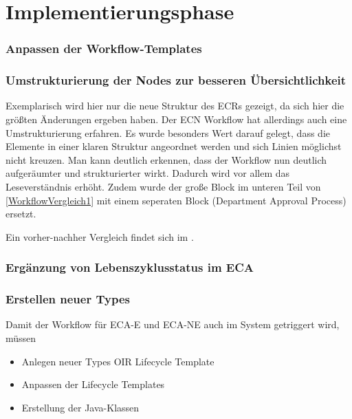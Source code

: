 \section{Implementierungsphase}  %
\label{sec:Implementierungsphase}

\subsubsection{Anpassen der Workflow-Templates}
\subsubsection*{Umstrukturierung der Nodes zur besseren Übersichtlichkeit}
Exemplarisch wird hier nur die neue Struktur des ECRs gezeigt, da sich hier die größten Änderungen ergeben haben.
Der ECN Workflow hat allerdings auch eine Umstrukturierung erfahren.
Es wurde besonders Wert darauf gelegt, dass die Elemente in einer klaren Struktur angeordnet werden und sich Linien möglichst nicht kreuzen.
Man kann deutlich erkennen, dass der Workflow nun deutlich aufgeräumter und strukturierter wirkt.
Dadurch wird vor allem das Leseverständnis erhöht.
Zudem wurde der große Block im unteren Teil von \autoref{WorkflowVergleich1} mit einem seperaten Block (Department Approval Process) ersetzt.

Ein vorher-nachher Vergleich findet sich im .



\subsubsection{Ergänzung von Lebenszyklusstatus im ECA}
\label{LebenszyklusstatusECA}

\subsubsection{Erstellen neuer Types}
Damit der Workflow für ECA-E und ECA-NE auch im System getriggert wird, müssen 

\begin{itemize}
	\item Anlegen neuer Types
	\subitem OIR
	\subitem Lifecycle Template
	\item Anpassen der Lifecycle Templates
	\item Erstellung der Java-Klassen
\end{itemize}

